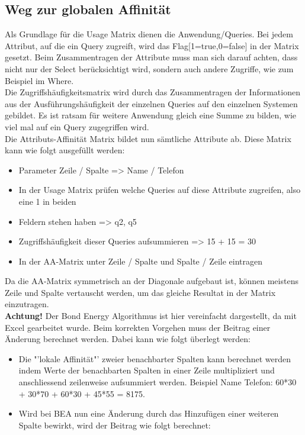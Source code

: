 \documentclass[a4paper,10pt,titlepage=false]{scrreprt}
\begin{document}
\begin{itemize}
\subsection{Weg zur globalen Affinität}
Als Grundlage für die Usage Matrix dienen die Anwendung/Queries. Bei jedem Attribut, auf die ein Query zugreift, wird das Flag[1=true,0=false] in der Matrix gesetzt. Beim Zusammentragen der Attribute muss man sich darauf achten, dass nicht nur der Select berücksichtigt wird, sondern auch andere Zugriffe, wie zum Beispiel im Where.\\
Die Zugriffshäufigkeitsmatrix wird durch das Zusammentragen der Informationen aus der Ausführungshäufigkeit der einzelnen Queries auf den einzelnen Systemen gebildet. Es ist ratsam für weitere Anwendung gleich eine Summe zu bilden, wie viel mal auf ein Query zugegriffen wird.\\
Die Attributs-Affinität Matrix bildet nun sämtliche Attribute ab. Diese Matrix kann wie folgt ausgefüllt werden:
\begin{itemize}
\item Parameter Zeile / Spalte => Name / Telefon
\item In der Usage Matrix prüfen welche Queries auf diese Attribute zugreifen, also eine 1 in beiden \item Feldern stehen haben => q2, q5
\item Zugriffshäufigkeit dieser Queries aufsummieren => 15 + 15 = 30
\item In der AA-Matrix unter Zeile / Spalte und Spalte / Zeile eintragen
\end{itemize}
Da die AA-Matrix symmetrisch an der Diagonale aufgebaut ist, können meistens Zeile und Spalte vertauscht werden, um das gleiche Resultat in der Matrix einzutragen.\\
\textbf{Achtung!} Der Bond Energy Algorithmus ist hier vereinfacht dargestellt, da mit Excel gearbeitet wurde. Beim korrekten Vorgehen muss der Beitrag einer Änderung berechnet werden. Dabei kann wie folgt überlegt werden:
\begin{itemize}
\item Die "'lokale Affinität"' zweier benachbarter Spalten kann berechnet werden indem Werte der benachbarten Spalten in einer Zeile multipliziert und anschliessend zeilenweise aufsummiert werden. Beispiel Name Telefon: 60*30 + 30*70 + 60*30 + 45*55 = 8175.
\item Wird bei BEA nun eine Änderung durch das Hinzufügen einer weiteren Spalte bewirkt, wird der Beitrag wie folgt berechnet:
\begin{itemize}

\end{itemize}
\end{itemize}
\end{itemize}
\end{document}
